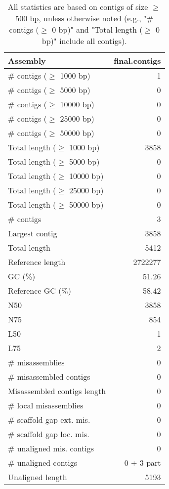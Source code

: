 \documentclass[12pt,a4paper]{article}
\begin{document}
\begin{table}[ht]
\begin{center}
\caption{All statistics are based on contigs of size $\geq$ 500 bp, unless otherwise noted (e.g., "\# contigs ($\geq$ 0 bp)" and "Total length ($\geq$ 0 bp)" include all contigs).}
\begin{tabular}{|l*{1}{|r}|}
\hline
Assembly & final.contigs \\ \hline
\# contigs ($\geq$ 1000 bp) & 1 \\ \hline
\# contigs ($\geq$ 5000 bp) & 0 \\ \hline
\# contigs ($\geq$ 10000 bp) & 0 \\ \hline
\# contigs ($\geq$ 25000 bp) & 0 \\ \hline
\# contigs ($\geq$ 50000 bp) & 0 \\ \hline
Total length ($\geq$ 1000 bp) & 3858 \\ \hline
Total length ($\geq$ 5000 bp) & 0 \\ \hline
Total length ($\geq$ 10000 bp) & 0 \\ \hline
Total length ($\geq$ 25000 bp) & 0 \\ \hline
Total length ($\geq$ 50000 bp) & 0 \\ \hline
\# contigs & 3 \\ \hline
Largest contig & 3858 \\ \hline
Total length & 5412 \\ \hline
Reference length & 2722277 \\ \hline
GC (\%) & 51.26 \\ \hline
Reference GC (\%) & 58.42 \\ \hline
N50 & 3858 \\ \hline
N75 & 854 \\ \hline
L50 & 1 \\ \hline
L75 & 2 \\ \hline
\# misassemblies & 0 \\ \hline
\# misassembled contigs & 0 \\ \hline
Misassembled contigs length & 0 \\ \hline
\# local misassemblies & 0 \\ \hline
\# scaffold gap ext. mis. & 0 \\ \hline
\# scaffold gap loc. mis. & 0 \\ \hline
\# unaligned mis. contigs & 0 \\ \hline
\# unaligned contigs & 0 + 3 part \\ \hline
Unaligned length & 5193 \\ \hline

\end{tabular}
\end{center}
\end{table}
\end{document}
